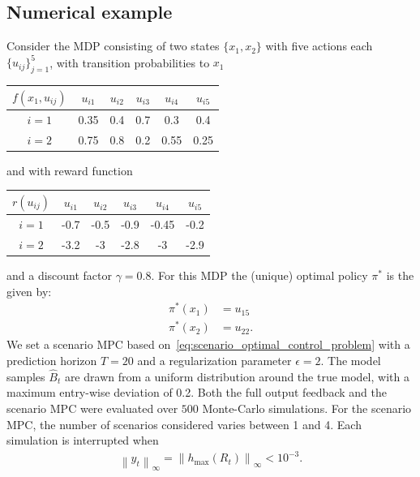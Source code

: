 \documentclass[10pt,leqno]{amsart}
\newcommand{\sml}{\scriptscriptstyle}
\newcommand{\norm}[1]{\left \|#1 \right \|}
\newcommand{\cost}{r}
\newcommand{\Cost}{R}
\newcommand{\f}{f}
\newcommand{\policy}{\pi}
\newcommand{\state}{x} %
\newcommand{\act}{u}   %
\newcommand{\disc}{\gamma}
\newcommand{\infnorm}[1]{\norm{#1}_\infty}
\newcommand{\outmap}{h_{\sml \text{max}}}
\newcommand{\Bapx}{\hat{B}}
\begin{document}
\subsection{Numerical example}
\label{subsec:section_3C}
Consider the MDP consisting of two states $\{\state_1, \state_2\}$ with five actions each $\{\act_{ij}\}_{j = 1}^5$, with transition probabilities to $\state_1$
\begin{center}
    \begin{tabular}{|c|c|c|c|c|c|}
        \hline
        $\f(\state_1, \act_{ij})$ & $\act_{i1}$ & $\act_{i2}$ & $\act_{i3}$ & $\act_{i4}$ & $\act_{i5}$\\
        \hline
        $i = 1$ & 0.35 & 0.4  & 0.7 & 0.3 & 0.4 \\
        $i = 2$ & 0.75 & 0.8 & 0.2 & 0.55 & 0.25  \\
        \hline
    \end{tabular}
\end{center}
and with reward function
\begin{center}
    \begin{tabular}{|c|c|c|c|c|c|}
        \hline
        $\cost(\act_{ij})$ & $\act_{i1}$ & $\act_{i2}$ & $\act_{i3}$ & $\act_{i4}$ & $\act_{i5}$\\
        \hline
        $i = 1$ & -0.7 & -0.5  & -0.9 & -0.45 & -0.2 \\
        $i = 2$ & -3.2 & -3 & -2.8 & -3    & -2.9  \\
        \hline
    \end{tabular}
\end{center}
and a discount factor $\disc = 0.8$. For this MDP the (unique) optimal policy $\policy^*$ is the given by:
\begin{align*}
    \policy^*(\state_1) &= \act_{15}\\
    \policy^*(\state_2) &= \act_{22}.
\end{align*}
We set a scenario MPC based on~\eqref{eq:scenario_optimal_control_problem} with a prediction horizon $T = 20$ and a regularization parameter $\epsilon = 2$. The model samples $\Bapx_t$ are drawn from a uniform distribution around the true model, with a maximum entry-wise deviation of 0.2. Both the full output feedback and the scenario MPC were evaluated over $500$ Monte-Carlo simulations. For the scenario MPC, the number of scenarios considered varies between 1 and 4. Each simulation is interrupted when
\begin{align*}
    \infnorm{y_t} = \infnorm{\outmap(\Cost_t)} < 10^{-3}.
\end{align*}
\end{document}
